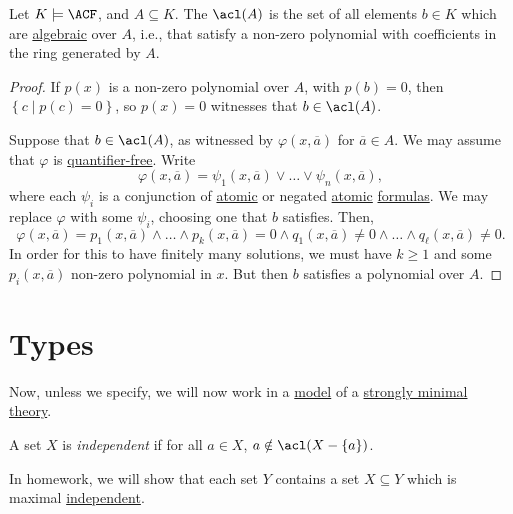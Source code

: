 \begin{theorem}
	Let \(K \models \ACF\), and \(A \subseteq K\). The \(\acl(A)\)  is the set of all elements \(b\in K\) which are \hyperref[def:algebraic]{algebraic} over \(A\), i.e., that satisfy a non-zero polynomial with coefficients in the ring generated by \(A\).
\end{theorem}
\begin{proof}
	If \(p(x)\) is a non-zero polynomial over \(A\), with \(p(b) = 0\), then \(\left\{ c \mid p(c) = 0 \right\} \), so \(p(x) = 0\) witnesses that \(b\in \acl(A)\).

	Suppose that \(b\in \acl(A)\), as witnessed by \(\varphi (x, \overline{a} )\) for \(\overline{a} \in A\). We may assume that \(\varphi \) is \hyperref[not:quantifier-free]{quantifier-free}. Write
	\[
		\varphi (x, \overline{a} ) = \psi _1(x, \overline{a} ) \lor \ldots \lor \psi _n(x, \overline{a} ),
	\]
	where each \(\psi _i\) is a conjunction of \hyperref[not:atomic]{atomic} or negated \hyperref[not:atomic]{atomic} \hyperref[def:formula]{formulas}. We may replace \(\varphi \) with some \(\psi _i\), choosing one that \(b\) satisfies. Then,
	\[
		\varphi (x, \overline{a} ) = p_1(x, \overline{a} ) \land \ldots \land p_k(x, \overline{a} ) = 0 \land q_1(x, \overline{a} ) \neq 0 \land \ldots \land q_{\ell}(x, \overline{a} ) \neq 0.
	\]
	In order for this to have finitely many solutions, we must have \(k \geq 1\) and some \(p_i(x, \overline{a} )\) non-zero polynomial in \(x\). But then \(b\) satisfies a polynomial over \(A\).
\end{proof}

\chapter{Types}
Now, unless we specify, we will now work in a \hyperref[def:model]{model} of a \hyperref[def:strongly-minimal]{strongly minimal} \hyperref[def:theory]{theory}.

\begin{definition}[Independent]\label{def:independent}
	A set \(X\) is \emph{independent} if for all \(a\in X\), \(a \notin \acl(X - \left\{ a \right\} )\).
\end{definition}

\begin{remark}
	In homework, we will show that each set \(Y\) contains a set \(X \subseteq Y\) which is maximal \hyperref[def:independent]{independent}.
\end{remark}

